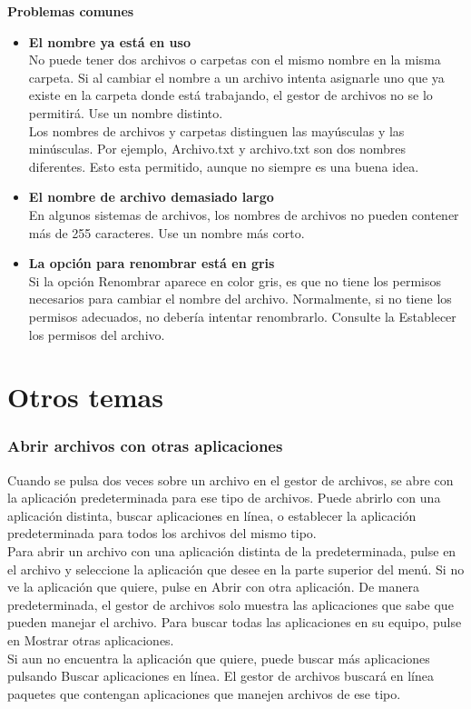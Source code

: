 {\bf Problemas comunes}
\begin{itemize}
\item {\bf El nombre ya está en uso}\\
No puede tener dos archivos o carpetas con el mismo nombre en la misma carpeta. Si al cambiar el nombre a un archivo intenta asignarle uno que ya existe en la carpeta donde está trabajando, el gestor de archivos no se lo permitirá. Use un nombre distinto.\\
Los nombres de archivos y carpetas distinguen las mayúsculas y las minúsculas. Por ejemplo, Archivo.txt y archivo.txt son dos nombres diferentes. Esto esta permitido, aunque no siempre es una buena idea.\\
\item {\bf El nombre de archivo demasiado largo}\\
En algunos sistemas de archivos, los nombres de archivos no pueden contener más de 255 caracteres. Use un nombre más corto.
\item {\bf La opción para renombrar está en gris}\\
Si la opción Renombrar aparece en color gris, es que no tiene los permisos necesarios para cambiar el nombre del archivo. Normalmente, si no tiene los permisos adecuados, no debería intentar renombrarlo. Consulte la Establecer los permisos del archivo.
\end{itemize}
\section{Otros temas}
\subsubsection{Abrir archivos con otras aplicaciones}
Cuando se pulsa dos veces sobre un archivo en el gestor de archivos, se abre con la aplicación predeterminada para ese tipo de archivos. Puede abrirlo con una aplicación distinta, buscar aplicaciones en línea, o establecer la aplicación predeterminada para todos los archivos del mismo tipo.\\

Para abrir un archivo con una aplicación distinta de la predeterminada, pulse en el archivo y seleccione la aplicación que desee en la parte superior del menú. Si no ve la aplicación que quiere, pulse en Abrir con otra aplicación. De manera predeterminada, el gestor de archivos solo muestra las aplicaciones que sabe que pueden manejar el archivo. Para buscar todas las aplicaciones en su equipo, pulse en Mostrar otras aplicaciones.\\
Si aun no encuentra la aplicación que quiere, puede buscar más aplicaciones pulsando Buscar aplicaciones en línea. El gestor de archivos buscará en línea paquetes que contengan aplicaciones que manejen archivos de ese tipo.\\

